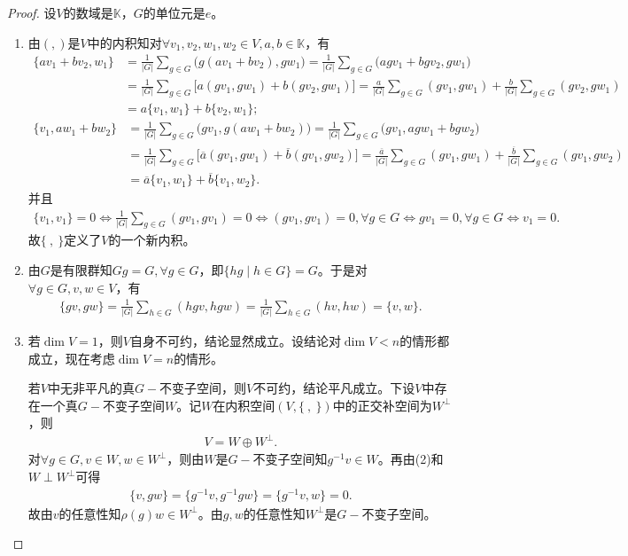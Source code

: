 \documentclass[../../main.tex]{subfiles}%
\begin{document}
\begin{proof}
设$V$的数域是$\mathbb{K}$，$G$的单位元是$e$。
\begin{enumerate}[(1)]
\item 由$(,)$是$V$中的内积知对$\forall v_1,v_2,w_1,w_2\in V,a,b\in \mathbb{K}$，有
\begin{align*}
\{av_1+bv_2,w_1\}&=\frac{1}{|G|}\sum\limits_{g\in G}\bigl(g(av_1+bv_2),gw_1\bigr)=\frac{1}{|G|}\sum\limits_{g\in G}\bigl(agv_1+bgv_2,gw_1\bigr)\\
&=\frac{1}{|G|}\sum\limits_{g\in G}\bigl[a(gv_1,gw_1)+b(gv_2,gw_1)\bigr]=\frac{a}{|G|}\sum\limits_{g\in G}(gv_1,gw_1)+\frac{b}{|G|}\sum\limits_{g\in G}(gv_2,gw_1)\\
&=a\{v_1,w_1\}+b\{v_2,w_1\};
\end{align*}
\begin{align*}
\{v_1,aw_1+bw_2\}&=\frac{1}{|G|}\sum\limits_{g\in G}\bigl(gv_1,g(aw_1+bw_2)\bigr)=\frac{1}{|G|}\sum\limits_{g\in G}\bigl(gv_1,agw_1+bgw_2\bigr)\\
&=\frac{1}{|G|}\sum\limits_{g\in G}\bigl[\overline{a}(gv_1,gw_1)+\overline{b}(gv_1,gw_2)\bigr]=\frac{\overline{a}}{|G|}\sum\limits_{g\in G}(gv_1,gw_1)+\frac{\overline{b}}{|G|}\sum\limits_{g\in G}(gv_1,gw_2)\\
&=\overline{a}\{v_1,w_1\}+\overline{b}\{v_1,w_2\}.
\end{align*}
并且
\begin{align*}
\{v_1,v_1\}=0\iff \frac{1}{|G|}\sum\limits_{g\in G}(gv_1,gv_1)=0\iff (gv_1,gv_1)=0,\forall g\in G\iff gv_1=0,\forall g\in G\iff v_1=0.
\end{align*}
故$\{\ ,\ \}$定义了$V$的一个新内积。

\item 由$G$是有限群知$Gg=G,\forall g\in G$，即$\{hg\mid h\in G\}=G$。于是对$\forall g\in G,v,w\in V$，有
\begin{align*}
\{gv,gw\}=\frac{1}{|G|}\sum\limits_{h\in G}(hgv,hgw)=\frac{1}{|G|}\sum\limits_{h\in G}(hv,hw)=\{v,w\}.
\end{align*}

\item 若$\dim V=1$，则$V$自身不可约，结论显然成立。设结论对$\dim V<n$的情形都成立，现在考虑$\dim V=n$的情形。

若$V$中无非平凡的真$G-$不变子空间，则$V$不可约，结论平凡成立。下设$V$中存在一个真$G-$不变子空间$W$。记$W$在内积空间$(V,\{\ ,\ \})$中的正交补空间为$W^\perp$，则
\begin{align}\label{eq:::::--OIOFwwff31-1}
V=W\oplus W^\perp.
\end{align}
对$\forall g\in G,v\in W,w\in W^\perp$，则由$W$是$G-$不变子空间知$g^{-1}v\in W$。再由(2)和$W\perp W^\perp$可得
\begin{align*}
\{v,gw\}=\{g^{-1}v,g^{-1}gw\}=\{g^{-1}v,w\}=0.
\end{align*}
故由$v$的任意性知$\rho(g)w\in W^\perp$。由$g,w$的任意性知$W^\perp$是$G-$不变子空间。


\end{enumerate}
\end{proof}
\end{document}
